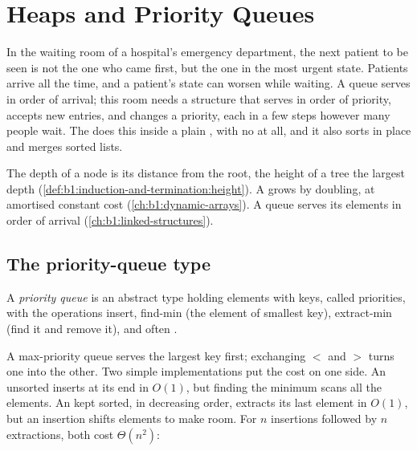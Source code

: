 \chapter{Heaps and Priority Queues}\label{ch:b1:heaps}

In the waiting room of a hospital's emergency department, the next patient to be seen is not the one who came first,
but the one in the most urgent state. Patients arrive all the time, and a patient's state can worsen while waiting. A
queue serves in order of arrival; this room needs a structure that serves in order of priority, accepts new entries,
and changes a priority, each in a few steps however many people wait. The  does this inside a plain ,
with no  at all, and it also sorts in place and merges sorted lists.

\begin{recall}
The depth of a node is its distance from the root, the height of a tree the largest depth
(\cref{def:b1:induction-and-termination:height}). A
 grows by doubling, at amortised constant cost (\cref{ch:b1:dynamic-arrays}). A queue serves its elements
in order of arrival (\cref{ch:b1:linked-structures}).
\end{recall}

\section{The priority-queue type}\label{sec:b1:heaps:pq}

\begin{definition}\label{def:b1:heaps:pq}
A \emph{priority queue} is an abstract type holding elements with keys, called priorities, with
the operations insert, find-min (the element of smallest key), extract-min (find it and remove it), and often
.
\end{definition}

A max-priority queue serves the largest key first; exchanging $<$ and $>$ turns one into the other. Two simple
implementations put the cost on one side. An unsorted  inserts at its end in $O(1)$, but finding the minimum scans
all the elements. An  kept sorted, in decreasing order, extracts its last element in $O(1)$, but an insertion
shifts elements to make room. For $n$ insertions followed by $n$ extractions, both cost $\Theta(n^2)$:

